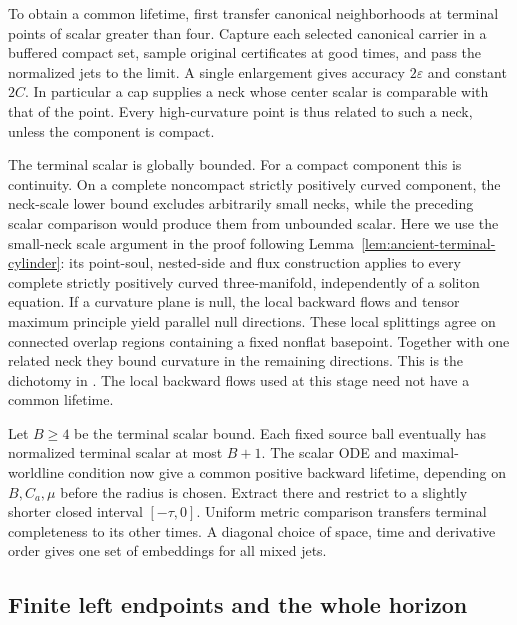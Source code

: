 To obtain a common lifetime, first transfer canonical neighborhoods at
terminal points of scalar greater than four. Capture each selected canonical carrier in
a buffered compact set, sample original certificates at good times, and
pass the normalized jets to the limit. A single enlargement gives accuracy
$2\varepsilon$ and constant $2C$. In particular a cap supplies a neck
whose center scalar is comparable with that of the point. Every
high-curvature point is thus related to such a neck, unless the component
is compact.

The terminal scalar is globally bounded. For a compact component this is
continuity. On a complete noncompact strictly positively curved component,
the neck-scale lower bound excludes arbitrarily small necks, while the
preceding scalar comparison would produce them from unbounded scalar.
Here we use the small-neck scale argument in the proof following
Lemma~\ref{lem:ancient-terminal-cylinder}: its point-soul, nested-side
and flux construction applies to every complete strictly positively curved
three-manifold, independently of a soliton equation.
If a curvature plane is null, the local backward flows and tensor maximum
principle yield parallel null directions. These local splittings agree on
connected overlap regions containing a fixed nonflat basepoint. Together
with one related neck they bound curvature in the remaining directions.
This is the dichotomy in \cite[Claim 11.7, pp. 270--271]{MT2007}.
The local backward flows used at this stage need not have a common lifetime.

Let $B\geq4$ be the terminal scalar bound. Each fixed source ball eventually
has normalized terminal scalar at most $B+1$. The scalar ODE and
maximal-worldline condition now give a common positive backward lifetime,
depending on $B,C_a,\mu$ before the radius is chosen. Extract there and
restrict to a slightly shorter closed interval $[-\tau,0]$. Uniform
metric comparison transfers terminal completeness to its other times.
A diagonal choice of space, time and derivative order gives one set of
embeddings for all mixed jets.

\subsection{Finite left endpoints and the whole horizon}

